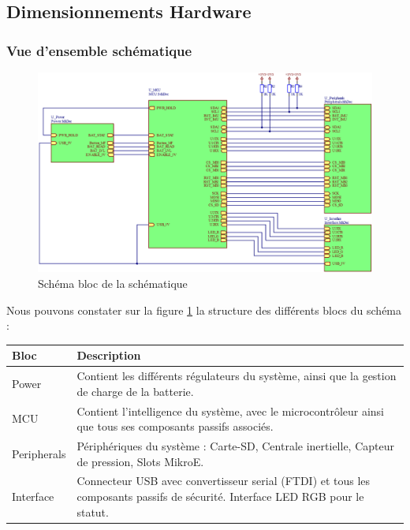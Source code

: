 \subsection{Dimensionnements Hardware} \label{ssec:num31}
{
	\subsubsection{Vue d'ensemble schématique} \label{sssec:SchemaBloc} \vspace{-6mm}
	{
		\begin{figure}[th]
			\centering
			\includegraphics[width=1.1\linewidth]{Figures/Dev-SCH/schemaBloc}
			\caption{Schéma bloc de la schématique}
			\label{fig:schemablocSCH}
		\end{figure} \vspace{-5mm}
		Nous pouvons constater sur la figure \ref{fig:schemablocSCH} la structure des différents blocs du schéma : 
		
		\begin{tabularx}{18cm}{|X|X|}
			\hline
			Bloc & Description \\
			\hline
			\hline
			Power & Contient les différents régulateurs du système, ainsi que la gestion de charge de la batterie. \\
			\hline
			MCU & Contient l'intelligence du système, avec le microcontrôleur ainsi que tous ses composants passifs associés. \\
			\hline
			Peripherals & Périphériques du système : Carte-SD, Centrale inertielle, Capteur de pression, Slots MikroE. \\ 
			\hline
			Interface & Connecteur USB avec convertisseur serial (FTDI) et tous les composants passifs de sécurité. Interface LED RGB pour le statut. \\
			\hline
		\end{tabularx}
	}


}
